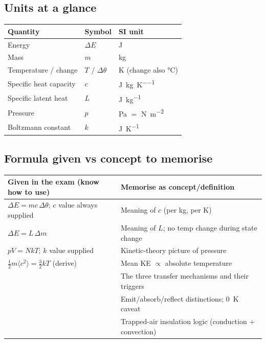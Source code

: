 \documentclass[11pt,a4paper]{article}
\newcommand{\dtheta}{\Delta\theta}
\newcommand{\dE}{\Delta E}
\begin{document}
\subsection{Units at a glance}
\begin{center}
\renewcommand{\arraystretch}{1.25}
\begin{tabular}{@{}lll@{}}
\toprule
\textbf{Quantity} & \textbf{Symbol} & \textbf{SI unit} \\
\midrule
Energy & $\dE$ & \si{\joule} \\
Mass & $m$ & \si{\kilogram} \\
Temperature / change & $T$ / $\dtheta$ & \si{\kelvin} (change also \si{\celsius}) \\
Specific heat capacity & $c$ & \si{\joule\per\kilogram\per\kelvin} \\
Specific latent heat & $L$ & \si{\joule\per\kilogram} \\
Pressure & $p$ & \si{\pascal} $=$ \si{\newton\per\metre\squared} \\
Boltzmann constant & $k$ & \si{\joule\per\kelvin} \\
\bottomrule
\end{tabular}
\end{center}

\subsection{Formula given vs concept to memorise}
\begin{center}
\renewcommand{\arraystretch}{1.25}
\begin{tabular}{@{}p{7.2cm}p{7.2cm}@{}}
\toprule
\textbf{Given in the exam (know how to use)} & \textbf{Memorise as concept/definition} \\
\midrule
$\dE = mc\,\dtheta$; $c$ value always supplied & Meaning of $c$ (per kg, per K) \\
$\dE = L\,\Delta m$ & Meaning of $L$; no temp change during state change \\
$pV = NkT$; $k$ value supplied & Kinetic-theory picture of pressure \\
$\tfrac12 m\langle c^2\rangle=\tfrac32 kT$ (derive) & Mean KE $\propto$ absolute temperature \\
& The three transfer mechanisms and their triggers \\
& Emit/absorb/reflect distinctions; \SI{0}{K} caveat \\
& Trapped-air insulation logic (conduction + convection) \\
\bottomrule
\end{tabular}
\end{center}
\end{document}
